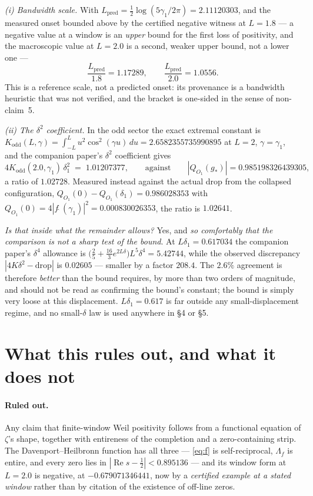 \documentclass[11pt,a4paper]{article}
\theoremstyle{definition}
\theoremstyle{remark}
\begin{document}
\emph{(i) Bandwidth scale.} With
$L_{\mathrm{pred}} = \tfrac12\log(5\gamma_1/2\pi) = 2.11120303$, and the measured onset
bounded above by the certified negative witness at $L=1.8$ --- a negative value at a
window is an \emph{upper} bound for the first loss of positivity, and the macroscopic
value at $L=2.0$ is a second, weaker upper bound, not a lower one ---
\[
\frac{L_{\mathrm{pred}}}{1.8} = 1.17289, \qquad
\frac{L_{\mathrm{pred}}}{2.0} = 1.0556 .
\]
This is a reference scale, not a predicted onset: its provenance is a bandwidth heuristic
that was not verified, and the bracket is one-sided in the sense of non-claim~5.

\emph{(ii) The $\delta^2$ coefficient.} In the odd sector the exact extremal constant is
$K_{\mathrm{odd}}(L,\gamma) = \int_{-L}^{L}u^2\cos^2(\gamma u)\,du = 2.6582355735990895$
at $L=2$, $\gamma=\gamma_1$, and the companion paper's $\delta^2$ coefficient gives
\[
4K_{\mathrm{odd}}(2.0,\gamma_1)\,\delta_1^2 \;=\; 1.01207377,
\qquad\text{against}\qquad |Q_{O_1}(g_*)| = 0.985198326439305,
\]
a ratio of $1.02728$. Measured instead against the actual drop from the collapsed
configuration, $Q_{O_1}(0) - Q_{O_1}(\delta_1) = 0.986028353$ with
$Q_{O_1}(0) = 4|f\,\hat{}\,(\gamma_1)|^2 = 0.000830026353$, the ratio is $1.02641$.

\emph{Is that inside what the remainder allows?} Yes, and \emph{so comfortably that the
comparison is not a sharp test of the bound}. At $L\delta_1 = 0.617034$ the companion
paper's $\delta^4$ allowance is
$\bigl(\tfrac25+\tfrac{16}3e^{2L\delta}\bigr)L^5\delta^4 = 5.42744$, while the observed
discrepancy $|4K\delta^2 - \text{drop}|$ is $0.02605$ --- smaller by a factor $208.4$. The
$2.6\%$ agreement is therefore \emph{better} than the bound requires, by more than two
orders of magnitude, and should not be read as confirming the bound's constant; the bound
is simply very loose at this displacement. $L\delta_1 = 0.617$ is far outside any
small-displacement regime, and no small-$\delta$ law is used anywhere in \S4 or \S5.

\section{What this rules out, and what it does not}\label{sec:rules}

\paragraph{Ruled out.} Any claim that finite-window Weil positivity follows from a
functional equation of $\zeta$'s shape, together with entireness of the completion and a
zero-containing strip. The Davenport--Heilbronn function has all three --- \eqref{eq:f}
is self-reciprocal, $\Lambda_f$ is entire, and every zero lies in
$|\operatorname{Re}s-\tfrac12| < 0.895136$ --- and its window form at $L=2.0$ is negative, at $-0.679071346441$, now by a \emph{certified example at a stated window} rather than by citation of
the existence of off-line zeros.
\end{document}
